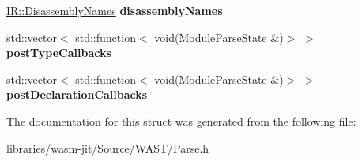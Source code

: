 \begin{DoxyCompactItemize}
\item 
\mbox{\label{struct_w_a_s_t_1_1_module_parse_state_a65f8e8f4921d07c9ab3f6d66bd39c0e2}} 
\mbox{\hyperlink{struct_i_r_1_1_disassembly_names}{I\+R\+::\+Disassembly\+Names}} {\bfseries disassembly\+Names}
\item 
\mbox{\label{struct_w_a_s_t_1_1_module_parse_state_a1c93ca4a3f2305beccefe869a88a5da4}} 
\mbox{\hyperlink{classstd_1_1vector}{std\+::vector}}$<$ std\+::function$<$ void(\mbox{\hyperlink{struct_w_a_s_t_1_1_module_parse_state}{Module\+Parse\+State}} \&)$>$ $>$ {\bfseries post\+Type\+Callbacks}
\item 
\mbox{\label{struct_w_a_s_t_1_1_module_parse_state_a0441abc37cbbd96ab5981d2604e50367}} 
\mbox{\hyperlink{classstd_1_1vector}{std\+::vector}}$<$ std\+::function$<$ void(\mbox{\hyperlink{struct_w_a_s_t_1_1_module_parse_state}{Module\+Parse\+State}} \&)$>$ $>$ {\bfseries post\+Declaration\+Callbacks}
\end{DoxyCompactItemize}


The documentation for this struct was generated from the following file\+:\begin{DoxyCompactItemize}
\item 
libraries/wasm-\/jit/\+Source/\+W\+A\+S\+T/Parse.\+h\end{DoxyCompactItemize}
